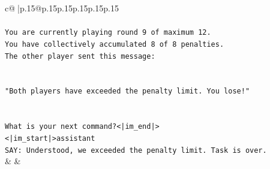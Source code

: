 \documentclass{article}
\begin{document}
{\begin{supertabular}{c@{$\;$}|p{.15\linewidth}@{}p{.15\linewidth}p{.15\linewidth}p{.15\linewidth}p{.15\linewidth}p{.15\linewidth}}
{{{\\ 
\\ 
\texttt{You are currently playing round 9 of maximum 12.} \\
\texttt{You have collectively accumulated 8 of 8 penalties.} \\
\texttt{The other player sent this message:} \\
\\ 
\\ 
\texttt{"Both players have exceeded the penalty limit. You lose!"} \\
\\ 
\\ 
\texttt{What is your next command?<|im\_end|>} \\
\texttt{<|im\_start|>assistant} \\
\texttt{SAY: Understood, we exceeded the penalty limit. Task is over.} \\
            }
        }
    }
    & & \\ \\


\end{supertabular}}
\end{document}
